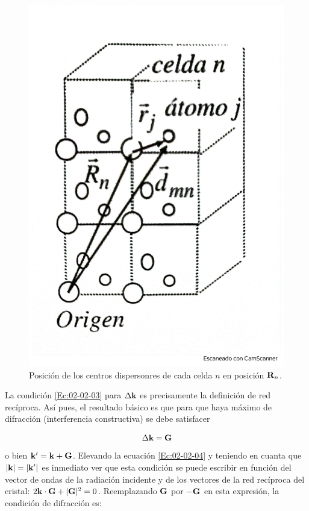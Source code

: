 \begin{figure}[h!] \centering
    \includegraphics[scale=0.30]{Cuerpo/Ch_02/Fotos_libro 3.pdf}
    \caption{Posición de los centros dispersonres de cada celda $n$ en posición $\mathbf{R}_n$.}
    \label{Fig:02-03}
\end{figure}



La condición \ref{Ec:02-02-03} para $\Delta \mathbf{k}$ es precisamente la definición de red recíproca. Así pues, el resultado básico es que para que haya máximo de difracción (interferencia constructiva) se debe satisfacer 


\begin{equation}
    \Delta \mathbf{k} = \mathbf{G}\label{Ec:02-02-04}
\end{equation}
o bien $\mathbf{k}'=\mathbf{k}+\mathbf{G}$. Elevando la ecuación \ref{Ec:02-02-04} y teniendo en cuanta que $|\mathbf{k}|=|\mathbf{k}'|$ es inmediato ver que esta condición se puede escribir en función del vector de ondas de la radiación incidente y de los vectores de la red recíproca del cristal: $2\mathbf{k} \cdot \mathbf{G} + |\mathbf{G}|^2 = 0$. Reemplazando $\mathbf{G}$ por $-\mathbf{G}$ en esta expresión, la condición de difracción es: 

